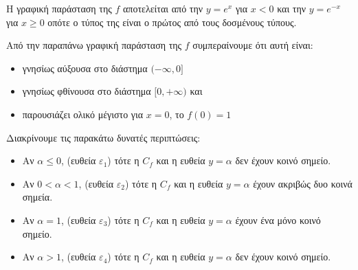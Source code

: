 \documentclass[11pt,a4paper,twoside]{book}
\begin{document}
\begin{alist}
\item Η γραφική παράσταση της $f$ αποτελείται από την $y = e^x$ για $x < 0$ και την $y = e^{-x}$ για $x \ge 0$ οπότε ο τύπος της είναι ο πρώτος από τους δοσμένους τύπους.
\begin{center}
\end{center}
\item Από την παραπάνω γραφική παράσταση της $f$ συμπεραίνουμε ότι αυτή είναι:
\begin{itemize}
    \item γνησίως αύξουσα στο διάστημα $(-\infty, 0]$
    \item γνησίως φθίνουσα στο διάστημα $[0, +\infty)$ και
    \item παρουσιάζει ολικό μέγιστο για $x = 0$, το $f(0) = 1$
\end{itemize}
\item Διακρίνουμε τις παρακάτω δυνατές περιπτώσεις:
\begin{itemize}
    \item Αν $\alpha \le 0$, (ευθεία $\varepsilon_1$) τότε η $C_f$ και η ευθεία $y = \alpha$ δεν έχουν κοινό σημείο.
    \item Αν $0 < \alpha < 1$, (ευθεία $\varepsilon_2$) τότε η $C_f$ και η ευθεία $y = \alpha$ έχουν ακριβώς δυο κοινά σημεία.
    \item Αν $\alpha = 1$, (ευθεία $\varepsilon_3$) τότε η $C_f$ και η ευθεία $y = \alpha$ έχουν ένα μόνο κοινό σημείο.
    \item Αν $\alpha > 1$, (ευθεία $\varepsilon_4$) τότε η $C_f$ και η ευθεία $y = \alpha$ δεν έχουν κοινό σημείο.
\end{itemize}
\begin{center}
\begin{tikzpicture}

\end{tikzpicture}
\end{center}
\end{alist}
\end{document}
